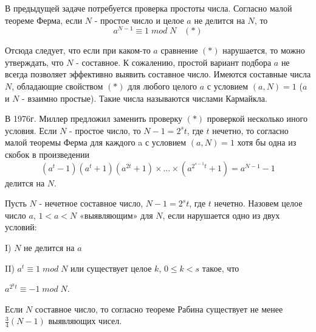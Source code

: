 \begin{remark}
В предыдущей задаче потребуется проверка простоты числа. 
Согласно малой теореме Ферма, если $N$ - простое число и целое $a$ не делится на $N$, то  
\[a^{N-1} \equiv 1\; mod\; N                         \; \; \;            \left(*\right)\] 

Отсюда следует, что если при каком-то $a$ сравнение $\left(*\right)$ нарушается, то можно утверждать, что $N$ - составное. 
К сожалению,  простой вариант подбора $a$ не всегда позволяет эффективно выявить составное число. Имеются составные числа $N$, обладающие свойством $\left(*\right)$ для любого целого $a$ с условием $\left(a,N\right)=1$ ($a$ и $N$ - взаимно простые). Такие числа называются числами Кармайкла.

В 1976г. Миллер предложил заменить проверку $\left(*\right)$ проверкой несколько иного условия. Если $N$ - простое число, то $N-1=2^{s} t$, где $t$ нечетно, то согласно малой теоремы Ферма для каждого a с условием $\left(a,N\right)=1$ хотя бы одна из скобок в произведении 
\[\left(a^{t} -1\right)\left(a^{t} +1\right)\left(a^{2t} +1\right)\times \ldots \times \left(a^{2^{s-1} t} +1\right)=a^{N-1} -1\] 
делится на $N$. 

Пусть $N$ - нечетное составное число, $N-1=2^{s} t$, где \textbf{$t$ }нечетно. Назовем целое число $a$, $1<a<N$ «выявляющим» для $N$, если нарушается одно из двух условий:

I) $N$ не делится на $a$

II) $a^{t} \equiv 1\; mod\; N$ или существует целое $k$, $0\le k<s$ такое, что 

$a^{2^{k} t} \equiv -1\; mod\; N$.

Если $N$ составное число, то согласно теореме Рабина  существует не менее $\frac{3}{4} \left(N-1\right)$  выявляющих чисел.

\end{remark}


